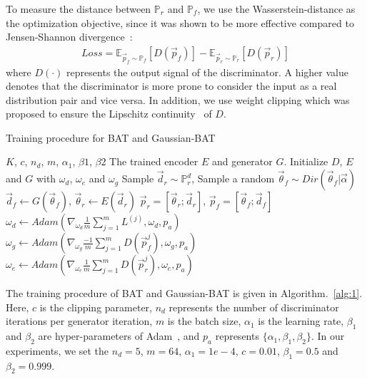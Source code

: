 \documentclass[11pt,a4paper]{article}
\begin{document}
To measure the distance between $\mathbb{P}_{r}$ and $\mathbb{P}_{f}$, we use the Wasserstein-distance as the optimization objective, since it was shown to be more effective compared to Jensen-Shannon divergence~\cite{arjovsky2017wasserstein}: \begin{align}
Loss=\mathbb{E}_{\vec p_{f}\sim \mathbb{P}_{f}}\left[D(\vec p_{f})\right]-\mathbb{E}_{\vec p_{r}\sim \mathbb{P}_{r}}\left[D(\vec p_{r})\right]
\end{align}
where $D(\cdot)$ represents the output signal of the discriminator. A higher value denotes that the discriminator is more prone to consider the input as a real distribution pair and vice versa. In addition, we use weight clipping which was proposed to ensure the Lipschitz continuity~\cite{arjovsky2017wasserstein} of $D$.\begin{algorithm}[!h]
	\renewcommand{\algorithmicrequire}{\textbf{Input:}}
	\renewcommand{\algorithmicensure}{\textbf{Output:}}
\caption{Training procedure for BAT and Gaussian-BAT}
	\label{alg:1}
	\begin{algorithmic}[1]
		\REQUIRE $K$, $c$, $n_{d}$, $m$, $\alpha_{1}$, $\beta{1}$, $\beta{2}$
		\ENSURE The trained encoder $E$ and generator $G$.
		\STATE Initialize $D$, $E$ and $G$ with $\omega_{d}$, $\omega_{e}$ and $\omega_{g}$
		\STATE Sample $\vec d_{r}\sim \mathbb{P}_{r}^{d}$, 
		\STATE Sample a random  $\vec\theta_{f}\sim Dir(\vec\theta_{f}|\vec\alpha)$ 
		\STATE $\vec d_{f}\leftarrow G(\vec\theta_{f})$, $\vec \theta_{r}\leftarrow E(\vec d_{r})$
		\STATE $\vec p_{r}=[\vec \theta_{r};\vec d_{r}]$, $\vec p_{f}=[\vec \theta_{f};\vec d_{f}]$
		\ENDFOR
		\STATE $\omega_{d}\leftarrow Adam(\nabla_{\omega_{d}}\frac{1}{m}\sum_{j=1}^{m}L^{(j)},\omega_{d},p_{a}) $
		\ENDFOR
		\STATE $\omega_{g}\leftarrow Adam(\nabla_{\omega_{g}}\frac{-1}{m}\sum_{j=1}^{m}D(\vec p_{f}^{j}),\omega_{g},p_{a})$
		\STATE $\omega_{e}\leftarrow Adam(\nabla_{\omega_{e}}\frac{1}{m}\sum_{j=1}^{m}D(\vec p_{r}^{j}),\omega_{e},p_{a})$
		\ENDWHILE 	
	\end{algorithmic}
\end{algorithm}

The training procedure of BAT and Gaussian-BAT is given in Algorithm.~\ref{alg:1}. Here, $c$ is the clipping parameter, $n_{d}$ represents the number of discriminator iterations per generator iteration, $m$ is the batch size, $\alpha_{1}$ is the learning rate, $\beta_{1}$ and $\beta_{2}$ are hyper-parameters of Adam~\cite{kingma2014adam}, and $p_{a}$ represents $\{\alpha_{1},\beta_{1},\beta_{2}\}$. In our experiments, we set the $n_{d}=5$, $m=64$, $\alpha_{1}=1e-4$, $c=0.01$, $\beta_{1}=0.5$ and $\beta_{2}=0.999$.
\end{document}
